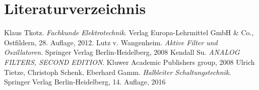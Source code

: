 \section{Literaturverzeichnis}

\begin{thebibliography}{99}
Klaus Tkotz. {\itshape Fachkunde Elektrotechnik}. Verlag Europa-Lehrmittel GmbH \& Co., Ostfildern, 28. Auflage, 2012.
Lutz v. Wangenheim. {\itshape Aktive Filter und Oszillatoren}. Springer Verlag Berlin-Heidelberg, 2008
Kendall Su. {\itshape ANALOG FILTERS, SECOND EDITION}. Kluwer Academic Publishers group, 2008
Ulrich Tietze, Christoph Schenk, Eberhard Gamm. {\itshape Halbleiter Schaltungstechnik}. Springer Verlag Berlin-Heidelberg, 14. Auflage, 2016
\end{thebibliography}